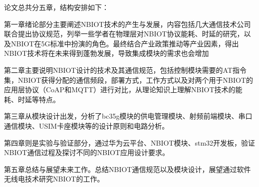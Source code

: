 论文总共分五章，结构安排如下：

第一章绪论部分主要阐述NBIOT技术的产生与发展，内容包括几大通信技术公司联合提出协议规范，列举一些学者在物理层对NBIOT协议能耗、时延的研究，以及NBIOT在5G标准中扮演的角色。最终结合产业政策推动等产业因素，得出NBIOT技术将在未来得到蓬勃发展，导致集成模块的需求也会增加

第二章主要说明NBIOT设计的技术及其通信规范，包括控制模块需要的AT指令集，NBIOT获得分配的通信频段，部署方式，工作方式以及对两个用于NBIOT的应用层协议（CoAP和MQTT）进行对比，从理论知识上理解NBIOT技术的能耗、时延等特点。

第三章从模块设计出发，分析了bc35g模块的供电管理模块、射频前端模块、串口通信模块、USIM卡座模块等的设计原则和电路分析。

第四章则是实验与验证部分，通过华为云平台、NBIOT模块、stm32开发板，验证NBIOT通信过程及探讨不同的NBIOT应用设计要求。

第五章总结与展望未来工作。总结NBIOT通信规范以及模块设计，展望通过软件无线电技术研究NBIOT的工作。